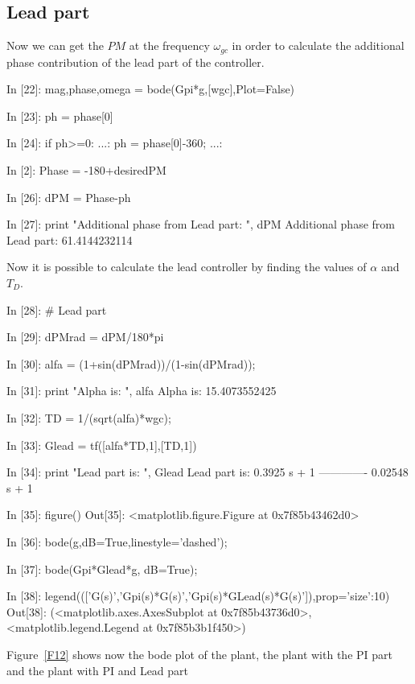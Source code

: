 \subsection{Lead part}

Now we can get the $PM$ at the frequency $\omega_{gc}$ in order to calculate 
the additional phase contribution of the lead part of the controller.

\begin{code}
In [22]: mag,phase,omega = bode(Gpi*g,[wgc],Plot=False)

In [23]: ph = phase[0]

In [24]: if ph>=0:
    ...:     ph = phase[0]-360;
    ...:     

In [2]: Phase = -180+desiredPM

In [26]: dPM = Phase-ph

In [27]: print "Additional phase from Lead part: ", dPM
Additional phase from Lead part:  61.4144232114
\end{code}

Now it is possible to calculate the lead controller by finding the values of 
$\alpha$ and $T_D$.

\begin{code}
In [28]: # Lead part

In [29]: dPMrad = dPM/180*pi

In [30]: alfa = (1+sin(dPMrad))/(1-sin(dPMrad));

In [31]: print "Alpha is: ", alfa
Alpha is:  15.4073552425

In [32]: TD = 1/(sqrt(alfa)*wgc);

In [33]: Glead = tf([alfa*TD,1],[TD,1])

In [34]: print "Lead part is: ", Glead
Lead part is:  
 0.3925 s + 1
-------------
0.02548 s + 1


In [35]: figure()
Out[35]: <matplotlib.figure.Figure at 0x7f85b43462d0>

In [36]: bode(g,dB=True,linestyle='dashed');

In [37]: bode(Gpi*Glead*g, dB=True);

In [38]: 
legend((['G(s)','Gpi(s)*G(s)','Gpi(s)*GLead(s)*G(s)']),prop={'size':10})
Out[38]: 
(<matplotlib.axes.AxesSubplot at 0x7f85b43736d0>,
 <matplotlib.legend.Legend at 0x7f85b3b1f450>)
\end{code}

Figure~\ref{F12} shows now the bode plot of the plant, the plant with the PI 
part and the plant with PI and Lead part

